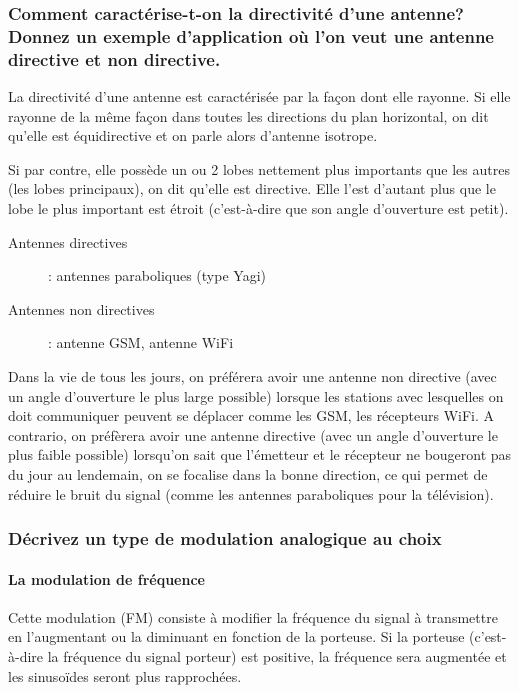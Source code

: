 \subsubsection{Comment caractérise-t-on la directivité d'une antenne? Donnez un
exemple d'application où l'on veut une antenne directive et non directive.}

La directivité d'une antenne est caractérisée par la façon dont elle rayonne. Si elle rayonne de la même façon dans toutes les directions du plan horizontal, on dit qu'elle est équidirective et on parle alors d'antenne isotrope.

Si par contre, elle possède un ou 2 lobes nettement plus importants que les autres (les lobes principaux), on dit qu'elle est directive. Elle l'est d'autant plus que le lobe le plus important est étroit (c'est-à-dire que son angle d'ouverture est petit).

\begin{description}
    \item[Antennes directives] : antennes paraboliques (type Yagi)
    \item[Antennes non directives] : antenne GSM, antenne WiFi
\end{description}

\bigskip

Dans la vie de tous les jours, on préférera avoir une antenne non directive (avec un angle d'ouverture le plus large possible) lorsque les stations avec lesquelles on doit communiquer peuvent se déplacer comme les GSM, les récepteurs WiFi. A contrario, on préfèrera avoir une antenne directive (avec un angle d'ouverture le plus faible possible) lorsqu'on sait que l'émetteur et le récepteur ne bougeront pas du jour au lendemain, on se focalise dans la bonne direction, ce qui permet de réduire le bruit du signal (comme les antennes paraboliques pour la télévision).  

\subsubsection{Décrivez un type de modulation analogique au choix}

\paragraph{La modulation de fréquence}

Cette modulation (FM) consiste à modifier la fréquence du signal à transmettre en l'augmentant ou la diminuant en fonction de la porteuse.  Si la porteuse (c'est-à-dire la fréquence du signal porteur) est positive, la fréquence sera augmentée et les sinusoïdes seront plus rapprochées.

